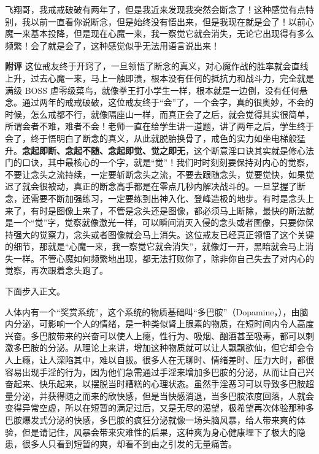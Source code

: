 \begin{case}
    飞翔哥，我戒戒破破有两年了，但是我近来发现我突然会断念了！这种感觉有点特别，我以前一直看你说断念，但是始终没有悟出来，但是我现在就是会了！以前心魔一来基本投降，但是现在心魔一来，我一察觉它就会消失，无论它出现得有多么频繁！会了就是会了，这种感觉似乎无法用语言说出来！

    \textbf{附评} 这位戒友终于开窍了，一旦领悟了断念的真义，对心魔作战的胜率就会直线上升，过去心魔一来，马上一触即溃，根本没有任何的抵抗力和战斗力，完全就是满级 BOSS 虐零级菜鸟，就像拳王打小学生一样，根本就是一边倒，没有任何悬念。通过两年的戒戒破破，这位戒友终于“会”了，一个会字，真的很奥妙，不会的时候，怎么戒都不行，就像隔座山一样，而真正会了之后，就会觉得其实很简单，所谓会者不难，难者不会！老师一直在给学生讲一道题，讲了两年之后，学生终于会了，终于悟明白了断念的真义，从此就脱胎换骨了，戒色的实力如坐电梯般猛升。\textbf{念起即断、念起不随、念起即觉、觉之即无}，这个断意淫口诀其实就是修心法门的口诀，其中最核心的一个字，就是“觉”！我们时时刻刻要保持对内心的觉察，不要让念头之流持续，一定要斩断念头之流，不要去跟随念头，觉要觉快，如果觉迟了就会很被动，真正的断念高手都是在零点几秒内解决战斗的。一旦掌握了断念，还需要不断加强练习，一定要练到出神入化、登峰造极的地步。有时是念头上来了，有时是图像上来了，不管是念头还是图像，都必须马上断除，最快的断法就是一个“觉”字，觉察就像激光一样，可以瞬间消灭入侵的念头或者图像，只要你保持强大的觉察力，念头或者图像就会马上消失。这位戒友已经真正领悟了这个关键的细节，那就是“心魔一来，我一察觉它就会消失”，就像灯一开，黑暗就会马上消失一样。不管心魔如何频繁地出现，都无法打败你了，除非你自己失去了对内心的觉察，再次跟着念头跑了。
\end{case}

下面步入正文。

人体内有一个“奖赏系统”，这个系统的物质基础叫“多巴胺”（Dopamine，），由脑内分泌，可影响一个人的情绪，是一种类似肾上腺素的物质，在短时间内令人高度兴奋。多巴胺带来的兴奋可以使人上瘾，性行为、吸烟、酗酒甚至吸毒，都可以刺激多巴胺的分泌。从理论上来讲，增加这种物质就可以让人飘飘欲仙，但它却会令人上瘾，让人深陷其中，难以自拔。很多人在无聊时、情绪差时、压力大时，都很容易出现手淫的行为，因为他们急需通过手淫来增加多巴胺的分泌，从而让自己兴奋起来、快乐起来，以摆脱当时糟糕的心理状态。虽然手淫恶习可以导致多巴胺超量分泌，并获得随之而来的欣快感，但是当快感消退，当多巴胺浓度回落，人就会变得异常空虚，所以在短暂的满足过后，又是无尽的渴望，极希望再次体验那种多巴胺爆发式分泌的快感，多巴胺的疯狂分泌就像一场头脑风暴，给人带来爽的体验，但是请记住，风暴会带来灾难性的后果，这种爽为身心健康埋下了极大的隐患，很多人只看到短暂的爽，却看不到由之引发的无量痛苦。

